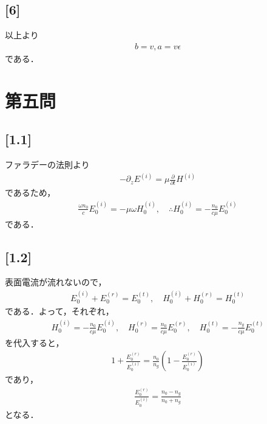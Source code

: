 \documentclass[12pt,dvipdfmx]{jsarticle}
\begin{document}
\subsection*{\large{[6]}}
以上より
\begin{eqnarray}
  b = v, a = v\epsilon
\end{eqnarray}
である．
\newpage
\section*{\Large{第五問}}

\subsection*{\large{[1.1]}}
ファラデーの法則より
\begin{eqnarray}
  -\partial_z E^{(i)}=  \mu \frac{\partial }{\partial t} H^{(i)}
\end{eqnarray}
であるため，
\begin{eqnarray}
  \frac{\omega n_0}{c} E_0^{(i)} = -\mu\omega H_0^{(i)},\quad\therefore H_0^{(i)} = -\frac{n_0 }{c\mu}E_0^{(i)}
\end{eqnarray}
である．
\subsection*{\large{[1.2]}}
表面電流が流れないので，
\begin{eqnarray}
  E_0^{(i)}+E_0^{(r)} = E_0^{(t)}, \quad H_0^{(i)}+H_0^{(r)} =H_0^{(t)}
\end{eqnarray}
である．よって，それぞれ，
\begin{eqnarray}
  H_0^{(i)} = -\frac{n_0 }{c\mu}E_0^{(i)},\quad H_0^{(r)} = \frac{n_0 }{c\mu}E_0^{(r)}, \quad H_0^{(t)} = -\frac{n_g }{c\mu}E_0^{(t)}
\end{eqnarray}
を代入すると，
\begin{eqnarray}
  1+ \frac{E_0^{(r)}}{E_0^{(i)}} = \frac{n_0}{n_g}\left( 1 - \frac{E_0^{(r)}}{E_0^{(i)}} \right)
\end{eqnarray}
であり，
\begin{eqnarray}
  \frac{E_0^{(r)}}{E_0^{(i)}} = \frac{n_0-n_g}{n_0+n_g}
\end{eqnarray}
となる．
\end{document}
